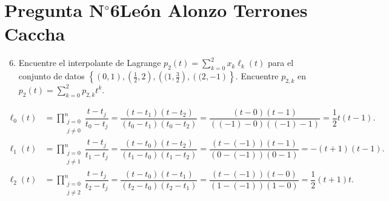 \section{Pregunta N$^{\circ}$6\qquad León Alonzo Terrones Caccha}


% 

\begin{frame}
	\begin{enumerate}\setcounter{enumi}{5}
		\item

		      Encuentre el interpolante de Lagrange
		      \begin{math}
			      p_{2}\left(t\right)=
			      \sum\limits_{k=0}^{2}
			      x_{k}
			      \ell_{k}\left(t\right)
		      \end{math}
		      para el conjunto de datos
		      \begin{math}
			      \left\{
			      \left(0,1\right),
			      \left(\frac{1}{2},2\right),
			      \left((1,\frac{3}{2}\right),
			      \left((2,-1\right)
			      \right\}
		      \end{math}.
		      Encuentre $p_{2,k}$ en
		      \begin{math}
			      p_{2}\left(t\right)=
			      \sum\limits_{k=0}^{2}
			      p_{2,k}t^{k}
		      \end{math}.
	\end{enumerate}

	\begin{solution}
		\begin{align*}
			\ell_{0}\left(t\right) & =
			\prod\limits_{\substack{j=0        \\j\neq 0}}^{n}
			\dfrac{t-t_{j}}{t_{0}-t_{j}}=
			\dfrac{\left(t-t_{1}\right)\left(t-t_{2}\right)}{\left(t_{0}-t_{1}\right)\left(t_{0}-t_{2}\right)}=
			\dfrac{\left(t-0\right)\left(t-1\right)}{\left(\left(-1\right)-0\right)\left(\left(-1\right)-1\right)}=
			\dfrac{1}{2}t\left(t-1\right).     \\
			\ell_{1}\left(t\right) & =
			\prod\limits_{\substack{j=0        \\j\neq 1}}^{n}
			\dfrac{t-t_{j}}{t_{1}-t_{j}}=
			\dfrac{\left(t-t_{0}\right)\left(t-t_{2}\right)}{\left(t_{1}-t_{0}\right)\left(t_{1}-t_{2}\right)}=
			\dfrac{\left(t-\left(-1\right)\right)\left(t-1\right)}{\left(0-\left(-1\right)\right)\left(0-1\right)}=
			-\left(t+1\right)\left(t-1\right). \\
			\ell_{2}\left(t\right) & =
			\prod\limits_{\substack{j=0        \\j\neq 2}}^{n}
			\dfrac{t-t_{j}}{t_{2}-t_{j}}=
			\dfrac{\left(t-t_{0}\right)\left(t-t_{1}\right)}{\left(t_{2}-t_{0}\right)\left(t_{2}-t_{1}\right)}=
			\dfrac{\left(t-\left(-1\right)\right)\left(t-0\right)}{\left(1-\left(-1\right)\right)\left(1-0\right)}=
			\dfrac{1}{2}\left(t+1\right)t.
		\end{align*}


\end{solution}
\end{frame}
